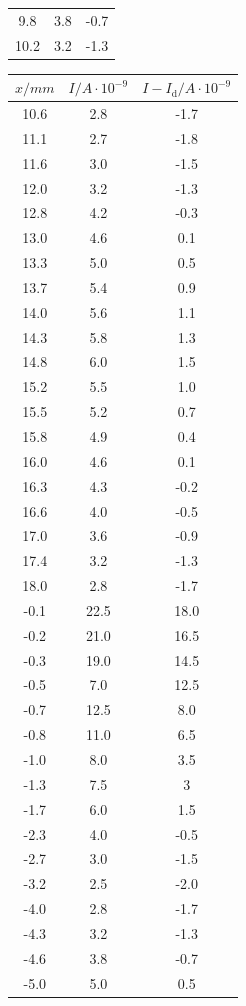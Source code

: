\begin{table}
\begin{minipage}{0.46\textwidth}
\begin{tabular}{c|c|c}
        9.8 & 3.8&-0.7\\
        10.2 & 3.2&-1.3\\
		\bottomrule 
	\end{tabular}
\end{minipage}
\begin{minipage}{0.46\textwidth}
	\begin{tabular}{c|c|c}
		\toprule
		{$x / mm$} & {$I / A\cdot10^{-9}$} & {$I - I_\text{d} / A\cdot10^{-9}$}\\
		\hline
        \midrule
        10.6 & 2.8&-1.7\\
        11.1 & 2.7&-1.8\\
        11.6 & 3.0&-1.5\\
        12.0 & 3.2&-1.3\\
        12.8 & 4.2&-0.3\\
        13.0 & 4.6&0.1\\
        13.3 & 5.0&0.5\\
        13.7 & 5.4&0.9\\
        14.0 & 5.6&1.1\\
        14.3 & 5.8&1.3\\
        14.8 & 6.0&1.5\\
        15.2 & 5.5&1.0\\
        15.5 & 5.2&0.7\\
        15.8 & 4.9&0.4\\
        16.0 & 4.6&0.1\\
        16.3 & 4.3&-0.2\\
        16.6 & 4.0&-0.5\\
        17.0 & 3.6&-0.9\\
        17.4 & 3.2&-1.3\\
        18.0 & 2.8&-1.7\\
        -0.1 & 22.5&18.0\\
        -0.2 & 21.0&16.5\\
        -0.3 & 19.0&14.5\\
        -0.5 & 7.0&12.5\\
        -0.7 & 12.5&8.0\\
        -0.8 & 11.0&6.5\\
        -1.0 & 8.0&3.5\\
        -1.3 & 7.5&3\\
        -1.7 & 6.0&1.5\\
        -2.3 & 4.0&-0.5\\
        -2.7 & 3.0&-1.5\\
        -3.2 & 2.5&-2.0\\
        -4.0 & 2.8&-1.7\\
        -4.3 & 3.2&-1.3\\
        -4.6 & 3.8&-0.7\\
        -5.0 & 5.0&0.5\\
		\bottomrule 
	\end{tabular}
\end{minipage}
\end{table}
